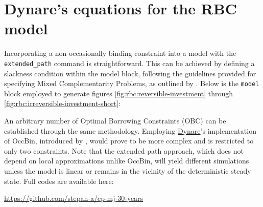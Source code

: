 \documentclass[a4paper,11pt]{amsart}
\newcommand{\Dynare}{\href{http://www.dynare.org}{Dynare}}
\begin{document}
\section{Dynare's equations for the RBC model}\label{appendix:rbc-mod}

Incorporating a non-occasionally binding constraint into a model
with the \verb+extended_path+ command is straightforward. This
can be achieved by defining a slackness condition within the model
block, following the guidelines provided for specifying Mixed
Complementarity Problems, as outlined by
\textcite{DynareManual}. Below is the \verb+model+ block employed to
generate figures \ref{fig:rbc:reversible-investment} through
\ref{fig:rbc:irreversible-investment-short}:



An arbitrary number of Optimal Borrowing Constraints (OBC) can be
established through the same methodology. Employing \Dynare's
implementation of OccBin, introduced by \textcite{OccBin}, would prove
to be more complex and is restricted to only two constraints. Note
that the extended path approach, which does not depend on local
approximations unlike OccBin, will yield different simulations unless
the model is linear or remains in the vicinity of the deterministic
steady state. Full codes are available here:
\begin{center}
   \url{https://github.com/stepan-a/ep-mj-30-years}
\end{center}

\newpage

\printbibliography
\end{document}
